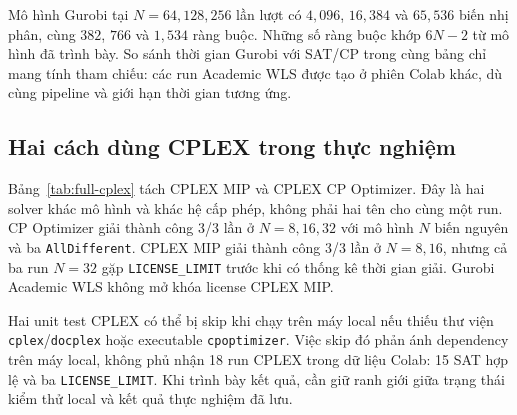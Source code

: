 \begin{table}[htbp]
\centering
\caption{Thời gian từng run Gurobi Academic WLS tại các kích thước bổ sung.
Các run đều có trạng thái SAT và nghiệm hợp lệ.}
\label{tab:full-gurobi}

\end{table}

Mô hình Gurobi tại $N=64,128,256$ lần lượt có $4{,}096$,
$16{,}384$ và $65{,}536$ biến nhị phân, cùng $382$, $766$ và
$1{,}534$ ràng buộc. Những số ràng buộc khớp $6N-2$ từ mô hình
đã trình bày. So sánh thời gian Gurobi với SAT/CP trong cùng bảng
chỉ mang tính tham chiếu: các run Academic WLS được tạo ở phiên
Colab khác, dù cùng pipeline và giới hạn thời gian tương ứng.

\subsection{Hai cách dùng CPLEX trong thực nghiệm}

Bảng~\ref{tab:full-cplex} tách CPLEX MIP và CPLEX CP Optimizer.
Đây là hai solver khác mô hình và khác hệ cấp phép, không phải hai
tên cho cùng một run. CP Optimizer giải thành công 3/3 lần ở
$N=8,16,32$ với mô hình $N$ biến nguyên và ba
\texttt{AllDifferent}. CPLEX MIP giải thành công 3/3 lần ở
$N=8,16$, nhưng cả ba run $N=32$ gặp \texttt{LICENSE\_LIMIT}
trước khi có thống kê thời gian giải. Gurobi Academic WLS không
mở khóa license CPLEX MIP.

\begin{table}[htbp]
\centering
\caption{Kết quả hai solver IBM trên Colab. Dấu -- là không có trung vị
thời gian của run hoàn thành.}
\label{tab:full-cplex}

\end{table}

Hai unit test CPLEX có thể bị skip khi chạy trên máy local nếu thiếu
thư viện \texttt{cplex}/\texttt{docplex} hoặc executable
\texttt{cpoptimizer}. Việc skip đó phản ánh dependency trên máy local,
không phủ nhận 18 run CPLEX trong dữ liệu Colab: 15 SAT hợp lệ và ba
\texttt{LICENSE\_LIMIT}. Khi trình bày kết quả, cần giữ ranh giới
giữa trạng thái kiểm thử local và kết quả thực nghiệm đã lưu.
